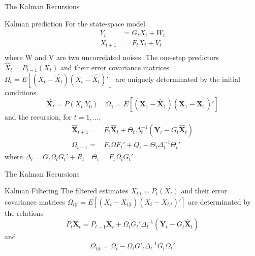 \documentclass[11pt]{beamer}
\begin{document}
\begin{frame}{The Kalman Recursions  \cite{brockwell2002introduction}}
\small
\begin{alertblock}{Kalman prediction}
For the state-space model 
\begin{equation*}
\begin{split}
Y_{t} &= G_{t}X_{t}+W_{t} \\
X_{t+1} &= F_{t}X_{t}+V_{t}\\
\end{split}
\end{equation*}
where W and V are two uncorrelated noises. The one-step predictors $\hat{X}_{t}=P_{t-1}(X_{t})$ and their error covariance matrices $\Omega_{t}=E\left[(X_{t}-\hat{X_{t}})(X_{t}-\hat{X_{t}})' \right]$ are uniquely determinated by the initial conditions 
\begin{equation*}
\hat{\bm{X}_{t}}=P(X_{t}|Y_{0}) \quad \Omega_{1}=E\left[\left(\bm{X}_{1}-\hat{\bm{X}}_{1}\right)\left(\bm{X}_{1}-\hat{\bm{X}}_{1}\right)' \right]
\end{equation*}
and the recursion, for $t=1,...,$ 
\begin{equation*}
\begin{split}
\hat{\bm{X}}_{t+1}=&F_{t}\hat{\bm{X}}_{t}+\Theta_{t}\Delta_{t}^{-1}\left( \bm{Y}_{t}-G_{t}\hat{\bm{X}}_{t}  \right) \\
\Omega_{t+1}=&F_{t} \Omega F_{t}'+Q_{t}-\Theta_{t}\Delta_{t}^{-1}\Theta_{t}'
\end{split}
\end{equation*}
where $\Delta_{t}=G_{t}\Omega_{t}G_{t}'+R_{t} \quad \Theta_{t}=F_{t}\Omega_{t}G_{t}'$
\end{alertblock}
\end{frame}


\begin{frame}{The Kalman Recursions   \cite{brockwell2002introduction}}
\small
\begin{alertblock}{Kalman Filtering}
The filtered estimates $X_{t|t}=P_{t}(X_{t})$ and their error covariance matrices $\Omega_{t|t}=E\left[\left(X_{t}-X_{t|t}\right)\left(X_{t}-X_{t|t}\right)' \right]$ are determinated by the relations 
\begin{equation*}
P_{t}\textbf{X}_{t}=P_{t-1}\textbf{X}_{t}+\Omega_{t}G_{t}'\Delta^{-1}_{t}\left(\textbf{Y}_{t}-G_{t}\hat{\textbf{X}}_{t} \right)
\end{equation*}
and 
\begin{equation*}
\Omega_{t|t}=\Omega_{t}-\Omega_{t}G'_{t}\Delta^{-1}_{t}G_{t}\Omega_{t}'
\end{equation*}
\end{alertblock}
\end{frame}
\end{document}
